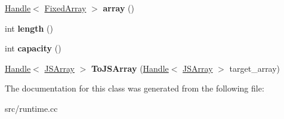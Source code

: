 \begin{DoxyCompactItemize}
\item 
\hypertarget{classv8_1_1internal_1_1_fixed_array_builder_aeb2d267be0c5e6e2e0255d33066729b5}{}\hyperlink{classv8_1_1internal_1_1_handle}{Handle}$<$ \hyperlink{classv8_1_1internal_1_1_fixed_array}{Fixed\+Array} $>$ {\bfseries array} ()\label{classv8_1_1internal_1_1_fixed_array_builder_aeb2d267be0c5e6e2e0255d33066729b5}

\item 
\hypertarget{classv8_1_1internal_1_1_fixed_array_builder_a329de6f0aa5c2c1d7fc52f4e1598401f}{}int {\bfseries length} ()\label{classv8_1_1internal_1_1_fixed_array_builder_a329de6f0aa5c2c1d7fc52f4e1598401f}

\item 
\hypertarget{classv8_1_1internal_1_1_fixed_array_builder_a624838799277a1948401049e00084525}{}int {\bfseries capacity} ()\label{classv8_1_1internal_1_1_fixed_array_builder_a624838799277a1948401049e00084525}

\item 
\hypertarget{classv8_1_1internal_1_1_fixed_array_builder_a3b89ea4964b24b673fe02c05c7274b23}{}\hyperlink{classv8_1_1internal_1_1_handle}{Handle}$<$ \hyperlink{classv8_1_1internal_1_1_j_s_array}{J\+S\+Array} $>$ {\bfseries To\+J\+S\+Array} (\hyperlink{classv8_1_1internal_1_1_handle}{Handle}$<$ \hyperlink{classv8_1_1internal_1_1_j_s_array}{J\+S\+Array} $>$ target\+\_\+array)\label{classv8_1_1internal_1_1_fixed_array_builder_a3b89ea4964b24b673fe02c05c7274b23}

\end{DoxyCompactItemize}


The documentation for this class was generated from the following file\+:\begin{DoxyCompactItemize}
\item 
src/runtime.\+cc\end{DoxyCompactItemize}
